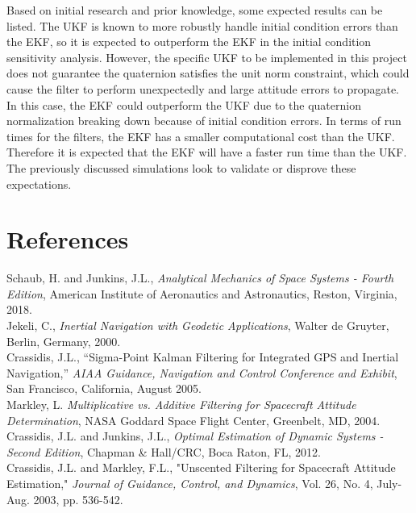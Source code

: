 \documentclass[12pt]{report}
\begin{document}
\noindent  Based on initial research and prior knowledge, some expected results can be listed. The UKF is known to more robustly handle initial condition errors than the EKF, so it is expected to outperform the EKF in the initial condition sensitivity analysis. However, the specific UKF to be implemented in this project does not guarantee the quaternion satisfies the unit norm constraint, which could cause the filter to perform unexpectedly and large attitude errors to propagate. In this case, the EKF could outperform the UKF due to the quaternion normalization breaking down because of initial condition errors. In terms of run times for the filters, the EKF has a smaller computational cost than the UKF. Therefore it is expected that the EKF will have a faster run time than the UKF. The previously discussed simulations look to validate or disprove these expectations. 

\newpage
\section*{References}

\noindent [1] Schaub, H. and Junkins, J.L., \textit{Analytical Mechanics of Space Systems - Fourth Edition}, American Institute of Aeronautics and Astronautics, Reston, Virginia, 2018.\\
\noindent [2] Jekeli, C., \textit{Inertial Navigation with Geodetic Applications}, Walter de Gruyter, Berlin, Germany, 2000.\\
\noindent [3] Crassidis, J.L., “Sigma-Point Kalman Filtering for Integrated GPS and Inertial Navigation,” \textit{AIAA Guidance, Navigation and Control Conference and Exhibit},
San Francisco, California, August 2005.\\
\noindent [4] Markley, L. \textit{Multiplicative vs. Additive Filtering for Spacecraft Attitude Determination}, NASA Goddard Space Flight Center, Greenbelt, MD, 2004. \\
\noindent [5] Crassidis, J.L. and Junkins, J.L., \textit{Optimal Estimation of Dynamic Systems - Second Edition}, Chapman \& Hall/CRC, Boca Raton, FL, 2012.\\
\noindent [6] Crassidis, J.L. and Markley, F.L., "Unscented Filtering for Spacecraft Attitude Estimation," \textit{Journal of Guidance, Control, and Dynamics}, Vol. 26, No. 4, July-Aug. 2003, pp. 536-542.
\end{document}
